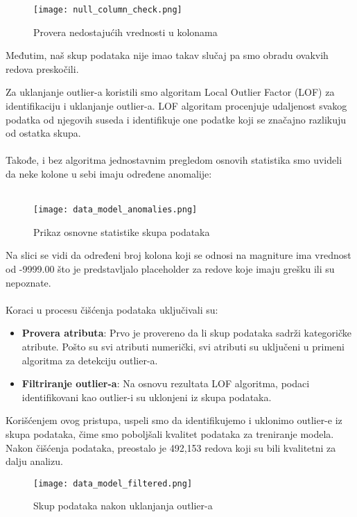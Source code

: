 \documentclass[a4paper,12pt]{article}
\begin{document}
\begin{figure}[H]
\centering
\texttt{[image: null\_column\_check.png]}
\caption{Provera nedostajućih vrednosti u kolonama}
\label{fig:sql_query}
\end{figure}

Međutim, naš skup podataka nije imao takav slučaj pa smo obradu ovakvih redova preskočili.

\clearpage
Za uklanjanje outlier-a koristili smo algoritam Local Outlier Factor (LOF) za identifikaciju i uklanjanje outlier-a. LOF algoritam procenjuje udaljenost svakog podatka od njegovih suseda i identifikuje one podatke koji se značajno razlikuju od ostatka skupa.\\\\
Takođe, i bez algoritma jednostavnim pregledom osnovih statistika smo uvideli da neke kolone u sebi imaju određene anomalije:\\\\

\begin{figure}[H]
\centering
\texttt{[image: data\_model\_anomalies.png]}
\caption{Prikaz osnovne statistike skupa podataka}
\label{fig:sql_query}
\end{figure}

Na slici se vidi da određeni broj kolona koji se odnosi na magniture ima vrednost od -9999.00 što je predstavljalo placeholder za redove koje imaju grešku ili su nepoznate.\\\\
Koraci u procesu čišćenja podataka uključivali su:
\begin{itemize}
    \item \textbf{Provera atributa}: Prvo je provereno da li skup podataka sadrži kategoričke atribute. Pošto su svi atributi numerički, svi atributi su uključeni u primeni algoritma za detekciju outlier-a.
    \item \textbf{Filtriranje outlier-a}: Na osnovu rezultata LOF algoritma, podaci identifikovani kao outlier-i su uklonjeni iz skupa podataka.
\end{itemize}
Korišćenjem ovog pristupa, uspeli smo da identifikujemo i uklonimo outlier-e iz skupa podataka, čime smo poboljšali kvalitet podataka za treniranje modela. Nakon čišćenja podataka, preostalo je 492,153 redova koji su bili kvalitetni za dalju analizu.

\begin{figure}[H]
\centering
\texttt{[image: data\_model\_filtered.png]}
\caption{Skup podataka nakon uklanjanja outlier-a}
\label{fig:sql_query}
\end{figure}
\end{document}
